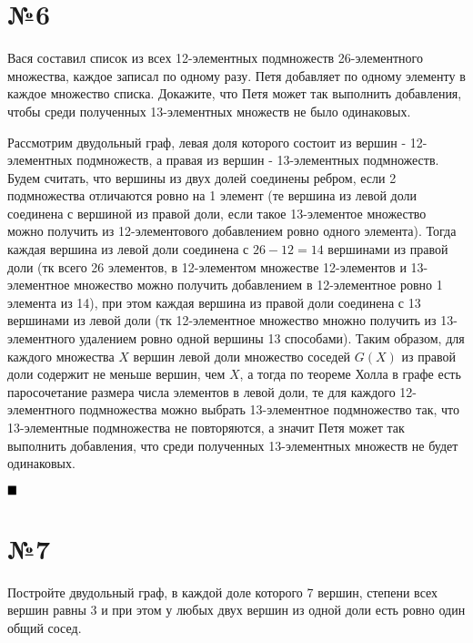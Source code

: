 \documentclass[a4paper, 16pt]{article}
\newenvironment{proof}[1][Доказательство]{%
	\begin{trivlist}
		\item[\hskip \labelsep {\bfseries #1:}]
		\item \hspace{14pt}
	}{
		$ \hfill\blacksquare $
	\end{trivlist}
	\hfill\break
}
\begin{document}
	\section*{№6}
	
		Вася составил список из всех 12-элементных подмножеств 26-элементного множества, каждое записал по одному разу. Петя добавляет по одному элементу в каждое множество списка. Докажите, что
		Петя может так выполнить добавления, чтобы среди полученных 13-элементных множеств не было
		одинаковых.
		
		\begin{proof}
			Рассмотрим двудольный граф, левая доля которого состоит из вершин - 12-элементных подмножеств, а правая из вершин - 13-элементных подмножеств. Будем считать, что вершины из двух долей соединены ребром, если 2 подмножества отличаются ровно на 1 элемент (те вершина из левой доли соединена с вершиной из правой доли, если такое 13-элементое множество можно получить из 12-элементового добавлением ровно одного элемента). Тогда каждая вершина из левой доли соединена с $26-12=14$ вершинами из правой доли (тк всего 26 элементов, в 12-элементом множестве 12-элементов и 13-элементное множество можно получить добавлением в 12-элементное ровно 1 элемента из 14), при этом каждая вершина из правой доли соединена с 13 вершинами из левой доли (тк 12-элементное множество множно получить из 13-элементного удалением ровно одной вершины 13 способами). Таким образом, для каждого множества $X$ вершин левой доли множество соседей $G(X)$ из правой доли содержит не меньше вершин, чем $X$, а тогда по теореме Холла в графе есть паросочетание размера числа элементов в левой доли, те для каждого 12-элементного подмножества можно выбрать 13-элементное подмножество так, что 13-элементные подмножества не повторяются, а значит Петя может так выполнить добавления, что среди полученных 13-элементных множеств не будет
			одинаковых.
		\end{proof}
	
	\section*{№7}
	
		Постройте двудольный граф, в каждой доле которого 7 вершин, степени всех вершин равны 3 и при
		этом у любых двух вершин из одной доли есть ровно один общий сосед.
		
\end{document}
